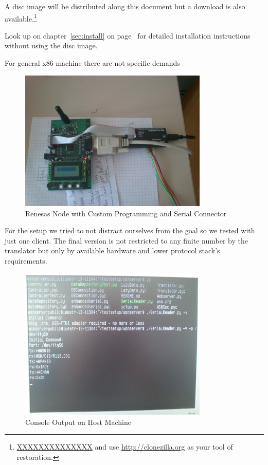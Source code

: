 A disc image will be distributed along this document but a download is also available.\footnote{\url{XXXXXXXXXXXXXX} and use 
\url{http://clonezilla.org} as your tool of restoration.}

Look up on chapter~\ref{sec:install} on page~\pageref{sec:install} for detailed installation instructions without using the disc image.

For general x86-machine there are not specific demands 

\begin{figure}[H]
   \centering
   \includegraphics[width=0.8\textwidth]{pic/controller.jpg}%
   \caption{Renesas Node with Custom Programming and Serial Connector}
   \label{nodepic}%
\end{figure}

For the setup we tried to not distract ourselves from the goal so we tested with just one client. The final version is not restricted
to any finite number by the translator but only by available hardware and lower protocol stack's requirements.

\begin{figure}[H]
   \centering
   \includegraphics[width=0.8\textwidth]{pic/host_machine.jpg}%
   \caption{Console Output on Host Machine}
   \label{hostpic}%
\end{figure}

